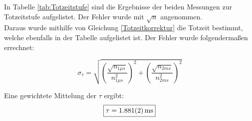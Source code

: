 \documentclass[12pt,a4paper]{article}
\begin{document}
In Tabelle \ref{tab:Totzeitstufe} sind die Ergebnisse der beiden Messungen zur Totzeitstufe aufgelistet. Der Fehler wurde mit $\sqrt{n}$ angenommen.\\
Daraus wurde mithilfe von Gleichung \ref{Totzeitkorrektur} die Totzeit bestimmt, welche ebenfalls in der Tabelle aufgelistet ist. Der Fehler wurde folgendermaßen errechnet:

\begin{equation}
\sigma_{\tau} = \sqrt{\left(\dfrac{\sqrt{n_{1\mu s}}}{n_{1\mu s}^{2}}\right)^2 + \left(\dfrac{\sqrt{n_{2ms}}}{n_{2ms}^{2}}\right)^2 }
\end{equation}

Eine gewichtete Mittelung der $\tau$ ergibt:
\begin{equation}
\boxed{\tau = \SI{1.881\pm 0.002}{ms}}
\end{equation}
\end{document}
